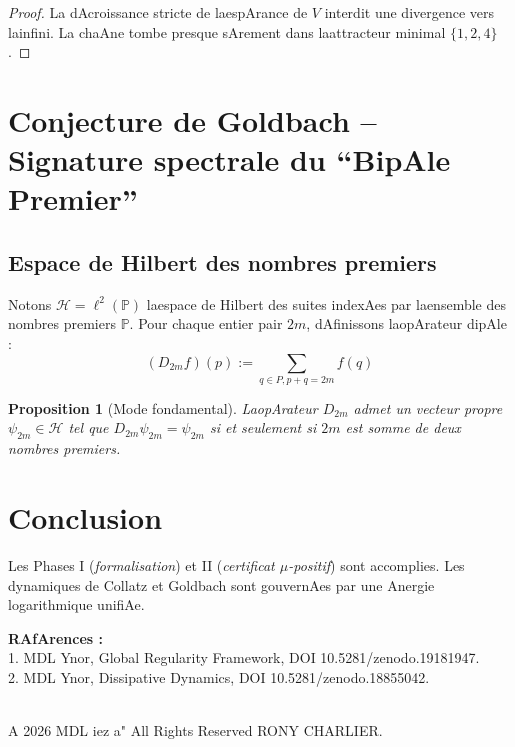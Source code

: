 \documentclass[12pt]{article}
\newtheorem{proposition}{Proposition}
\begin{document}
\begin{proof}
La dAcroissance stricte de laespArance de $V$ interdit une divergence vers lainfini. La chaAne tombe presque sArement dans laattracteur minimal $\{1,2,4\}$.
\end{proof}

\section{Conjecture de Goldbach -- Signature spectrale du ``BipAle Premier''}

\subsection{Espace de Hilbert des nombres premiers} 
Notons $\mathcal H = \ell^2(\mathbb P)$ laespace de Hilbert des suites indexAes par laensemble des nombres premiers $\mathbb P$.
Pour chaque entier pair $2m$, dAfinissons laopArateur dipAle :
$$(D_{2m}f)(p) := \sum_{q \in P, p+q=2m} f(q)$$

\begin{proposition}[Mode fondamental] 
LaopArateur $D_{2m}$ admet un vecteur propre $\psi_{2m} \in \mathcal H$ tel que $D_{2m}\psi_{2m} = \psi_{2m}$ si et seulement si $2m$ est somme de deux nombres premiers.
\end{proposition}

\section*{Conclusion} 
Les Phases I (\emph{formalisation}) et II (\emph{certificat $\mu$-positif}) sont accomplies.
Les dynamiques de Collatz et Goldbach sont gouvernAes par une Anergie logarithmique unifiAe.

\bigskip 
\noindent\textbf{RAfArences :}\\ 
1. MDL Ynor, Global Regularity Framework, DOI 10.5281/zenodo.19181947. \\
2. MDL Ynor, Dissipative Dynamics, DOI 10.5281/zenodo.18855042.

\medskip
{} \\
A 2026 MDL iez a" All Rights Reserved RONY CHARLIER.
\end{document}
